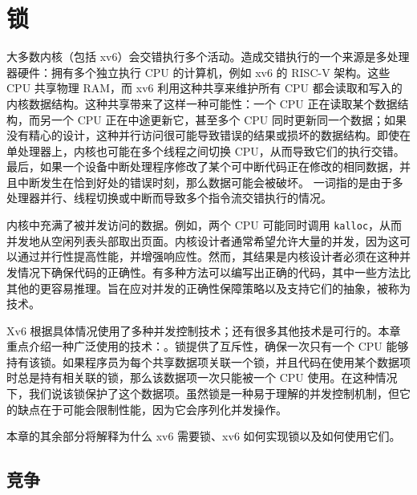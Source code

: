 \chapter{锁}
\label{CH:LOCK}

大多数内核（包括 xv6）会交错执行多个活动。造成交错执行的一个来源是多处理器硬件：拥有多个独立执行 CPU 的计算机，例如 xv6 的 RISC-V 架构。这些 CPU 共享物理 RAM，而 xv6 利用这种共享来维护所有 CPU 都会读取和写入的内核数据结构。这种共享带来了这样一种可能性：一个 CPU 正在读取某个数据结构，而另一个 CPU 正在中途更新它，甚至多个 CPU 同时更新同一个数据；如果没有精心的设计，这种并行访问很可能导致错误的结果或损坏的数据结构。即使在单处理器上，内核也可能在多个线程之间切换 CPU，从而导致它们的执行交错。最后，如果一个设备中断处理程序修改了某个可中断代码正在修改的相同数据，并且中断发生在恰到好处的错误时刻，那么数据可能会被破坏。
 一词指的是由于多处理器并行、线程切换或中断而导致多个指令流交错执行的情况。

内核中充满了被并发访问的数据。例如，两个 CPU 可能同时调用 {\tt kalloc}，从而并发地从空闲列表头部取出页面。内核设计者通常希望允许大量的并发，因为这可以通过并行性提高性能，并增强响应性。然而，其结果是内核设计者必须在这种并发情况下确保代码的正确性。有多种方法可以编写出正确的代码，其中一些方法比其他的更容易推理。旨在应对并发的正确性保障策略以及支持它们的抽象，被称为技术。

Xv6 根据具体情况使用了多种并发控制技术；还有很多其他技术是可行的。本章重点介绍一种广泛使用的技术：。锁提供了互斥性，确保一次只有一个 CPU 能够持有该锁。如果程序员为每个共享数据项关联一个锁，并且代码在使用某个数据项时总是持有相关联的锁，那么该数据项一次只能被一个 CPU 使用。在这种情况下，我们说该锁保护了这个数据项。虽然锁是一种易于理解的并发控制机制，但它的缺点在于可能会限制性能，因为它会序列化并发操作。

本章的其余部分将解释为什么 xv6 需要锁、xv6 如何实现锁以及如何使用它们。

%

\section{竞争}

